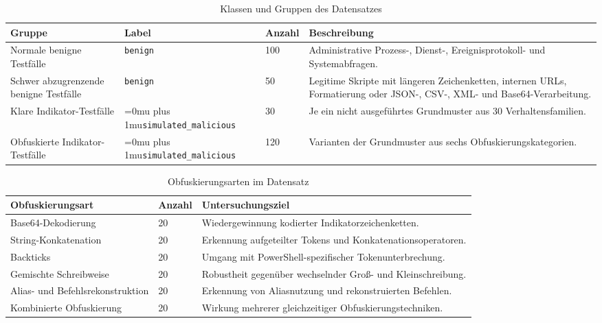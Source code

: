 \documentclass[12pt,a4paper,oneside,parskip=half]{scrreprt}
\newcommand{\codecell}[1]{\begingroup\Urlmuskip=0mu plus 1mu\relax\nolinkurl{#1}\endgroup}
\newcommand{\codebreak}[2]{\codecell{#1#2}}
\begin{document}
\begin{table}[H]
\centering
\caption[Klassen und Gruppen des Datensatzes]{Klassen und Gruppen des Datensatzes}
\label{tab:dataset-groups}
\small
\begin{tabularx}{\textwidth}{|L{3cm}|L{2.5cm}|C{1.5cm}|Y|}
\hline
\textbf{Gruppe} & \textbf{Label} & \textbf{Anzahl} & \textbf{Beschreibung}\\
\hline
Normale benigne Testfälle & \texttt{benign} & 100 & Administrative Prozess-, Dienst-, Ereignisprotokoll- und Systemabfragen.\\
\hline
Schwer abzugrenzende benigne Testfälle & \texttt{benign} & 50 & Legitime Skripte mit längeren Zeichenketten, internen URLs, Formatierung oder JSON-, CSV-, XML- und Base64-Verarbeitung.\\
\hline
Klare Indikator-Testfälle & \codebreak{simulated}{\_malicious} & 30 & Je ein nicht ausgeführtes Grundmuster aus 30 Verhaltensfamilien.\\
\hline
Obfuskierte Indikator-Testfälle & \codebreak{simulated}{\_malicious} & 120 & Varianten der Grundmuster aus sechs Obfuskierungskategorien.\\
\hline
\end{tabularx}
\end{table}

\begin{table}[H]
\centering
\caption[Obfuskierungsarten im Datensatz]{Obfuskierungsarten im Datensatz}
\label{tab:obfuscation-groups}
\small
\begin{tabularx}{\textwidth}{|L{4cm}|C{1.5cm}|Y|}
\hline
\textbf{Obfuskierungsart} & \textbf{Anzahl} & \textbf{Untersuchungsziel}\\
\hline
Base64-Dekodierung & 20 & Wiedergewinnung kodierter Indikatorzeichenketten.\\
\hline
String-Konkatenation & 20 & Erkennung aufgeteilter Tokens und Konkatenationsoperatoren.\\
\hline
Backticks & 20 & Umgang mit PowerShell-spezifischer Tokenunterbrechung.\\
\hline
Gemischte Schreibweise & 20 & Robustheit gegenüber wechselnder Groß- und Kleinschreibung.\\
\hline
Alias- und Befehlsrekonstruktion & 20 & Erkennung von Aliasnutzung und rekonstruierten Befehlen.\\
\hline
Kombinierte Obfuskierung & 20 & Wirkung mehrerer gleichzeitiger Obfuskierungstechniken.\\
\hline
\end{tabularx}
\end{table}
\end{document}
